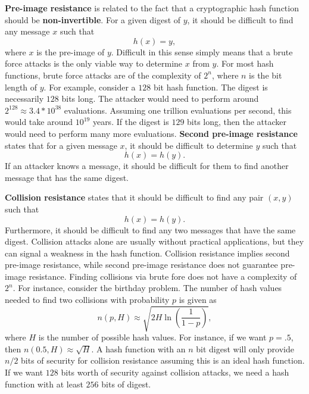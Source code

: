 \documentclass[11pt]{article}
\theoremstyle{plain} %
\theoremstyle{definition}
\theoremstyle{example}
\theoremstyle{remark}
\begin{document}
\textbf{Pre-image resistance} is related to the fact that a cryptographic hash function should be \textbf{non-invertible}. For a given digest of $y$, it should be difficult to find any message $x$ such that $$h(x) = y,$$
where $x$ is the pre-image of $y$. Difficult in this sense simply means that a brute force attacks is the only viable way to determine $x$ from $y$. For most hash functions, brute force attacks are of the complexity of $2^n$, where $n$ is the bit length of $y$. For example, consider a $128$ bit hash function. The digest is necessarily $128$ bits long. The attacker would need to perform around $2^{128} \approx 3.4*10^{38}$ evaluations. Assuming one trillion evaluations per second, this would take around $10^{19}$ years. If the digest is $129$ bits long, then the attacker would need to perform many more evaluations. \textbf{Second pre-image resistance} states that for a given message $x$, it should be difficult to determine $y$ such that $$h(x) = h(y).$$ If an attacker knows a message, it should be difficult for them to find another message that has the same digest. 

\textbf{Collision resistance} states that it should be difficult to find any pair $(x,y)$ such that $$h(x) = h(y).$$ Furthermore, it should be difficult to find any two messages that have the same digest. Collision attacks alone are usually without practical applications, but they can signal a weakness in the hash function. Collision resistance implies second pre-image resistance, while second pre-image resistance does not guarantee pre-image resistance. Finding collisions via brute fore does not have a complexity of $2^n$. For instance, consider the birthday problem. The number of hash values needed to find two collisions with probability $p$ is given as 
$$n(p,H) \approx \sqrt{2H\ln\left(\frac{1}{1-p}\right)},$$
where $H$ is the number of possible hash values. For instance, if we want $p=.5$, then $n(0.5, H) \approx \sqrt H$. A hash function with an $n$ bit digest will only provide $n/2$ bits of security for collision resistance assuming this is an ideal hash function. If we want $128$ bits worth of security against collision attacks, we need a hash function with at least $256$ bits of digest. 
\end{document}
